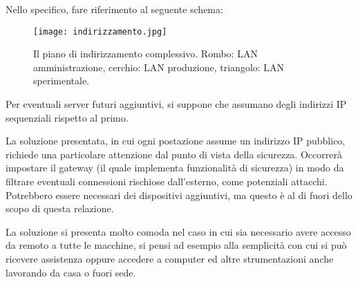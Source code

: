 Nello specifico, fare riferimento al seguente schema:

\begin{figure}[ht]
  \texttt{[image: indirizzamento.jpg]}
  \caption{Il piano di indirizzamento complessivo. Rombo: LAN amministrazione, cerchio: LAN produzione, triangolo: LAN sperimentale.}\label{fig:indirizzamento}
\end{figure}

Per eventuali server futuri aggiuntivi, si suppone che assumano degli indirizzi IP sequenziali rispetto al primo.

La soluzione presentata, in cui ogni postazione assume un indirizzo IP pubblico, richiede una particolare attenzione
dal punto di vista della sicurezza. Occorrerà impostare il gateway (il quale implementa funzionalità di sicurezza) in modo
da filtrare eventuali connessioni rischiose dall'esterno, come potenziali attacchi. Potrebbero essere necessari dei dispositivi
aggiuntivi, ma questo è al di fuori dello scopo di questa relazione.

La soluzione si presenta molto comoda nel caso in cui sia necessario avere accesso da remoto a tutte le macchine, si pensi ad esempio
alla semplicità con cui si può ricevere assistenza oppure accedere a computer ed altre strumentazioni anche lavorando da casa o fuori sede.